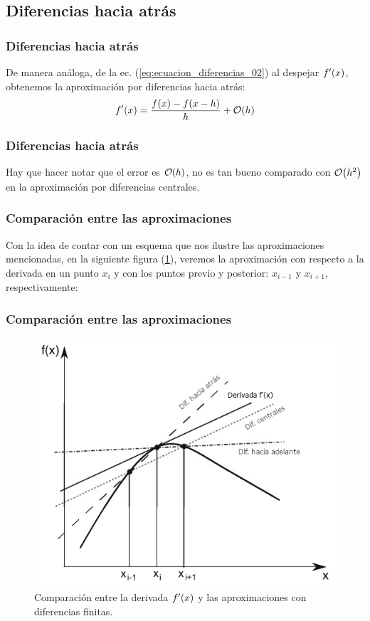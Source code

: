 \subsection*{Diferencias hacia atrás}
\begin{frame}
\frametitle{Diferencias hacia atrás}
De manera análoga, de la ec. (\ref{eq:ecuacion_diferencias_02}) al despejar ${f}^{\prime}(x)$, obtenemos la aproximación por diferencias hacia atrás:
\begin{align}
\ptilde{f}(x) = \dfrac{f(x) - f(x - h)}{h} + \order{h}
\label{eq:ecuacion_5_06}
\end{align}
\end{frame}
\begin{frame}
\frametitle{Diferencias hacia atrás}
Hay que hacer notar que el error es $\order{h}$, no es tan bueno comparado con $\order{h^{2}}$ en la aproximación por diferencias centrales.
\end{frame}
\begin{frame}
\frametitle{Comparación entre las aproximaciones}
Con la idea de contar con un esquema que nos ilustre las aproximaciones mencionadas, en la siguiente figura (\ref{fig:figura_Diferenciacion_02}), veremos la aproximación con respecto a la derivada en un punto $x_{i}$ y con los puntos previo y posterior: $x_{i-1}$ y $x_{i+1}$, respectivamente:
\end{frame}
\begin{frame}
\frametitle{Comparación entre las aproximaciones}
\begin{figure}[h!]
    \centering
    \includegraphics[scale=0.5]{Imagenes/Diferencias_02_Comparacion_Diferencias.png}
    \caption{Comparación entre la derivada ${f}^{\prime}(x)$ y las aproximaciones con diferencias finitas.}
    \label{fig:figura_Diferenciacion_02}
\end{figure}
\end{frame}
